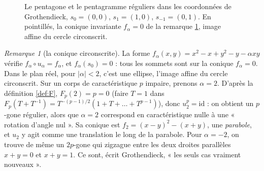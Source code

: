 \documentclass[11pt,a4paper]{article}
\theoremstyle{plain}
\theoremstyle{definition}
\theoremstyle{remark}
\newtheorem{remarque}[theoreme]{Remarque}
\begin{document}
\begin{figure}[h]
\centering
{}
\caption{Le pentagone et le pentagramme réguliers dans les coordonnées de Grothendieck, $s_0=(0,0)$, $s_1=(1,0)$, $s_{-1}=(0,1)$. En pointillés, la conique invariante $f_\alpha=0$ de la remarque \ref{rem:conique}, image affine du cercle circonscrit.}\label{fig:pentagones}
\end{figure}

\begin{remarque}[la conique circonscrite]\label{rem:conique}
La forme $f_\alpha(x,y)=x^2-x+y^2-y-\alpha xy$ vérifie $f_\alpha\circ u_\alpha=f_\alpha$, et $f_\alpha(s_0)=0$ : tous les sommets sont sur la conique $f_\alpha=0$. Dans le plan réel, pour $|\alpha|<2$, c'est une ellipse, l'image affine du cercle circonscrit. Sur un corps de caractéristique $p$ impaire, prenons $\alpha=2$. D'après la définition \ref{def:F}, $F_p(2)=p=0$ (faire $T=1$ dans $F_p(T+T^{-1})=T^{-(p-1)/2}(1+T+\dots+T^{p-1})$), donc $u_2^p=\mathrm{id}$ : on obtient un $p$-gone régulier, alors que $\alpha=2$ correspond en caractéristique nulle à une « rotation d'angle nul ». Sa conique est $f_2=(x-y)^2-(x+y)$, une \emph{parabole}, et $u_2$ y agit comme une translation le long de la parabole. Pour $\alpha=-2$, on trouve de même un $2p$-gone qui zigzague entre les deux droites parallèles $x+y=0$ et $x+y=1$. Ce sont, écrit Grothendieck, « les seuls cas vraiment nouveaux ».
\end{remarque}
\end{document}
